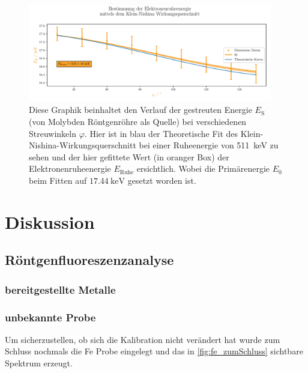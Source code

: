 \documentclass[12pt,english,ngerman]{scrartcl}
\begin{document}
\begin{figure}[H]
	\centering
	\includegraphics[width=0.95\textwidth]{figures/Klein-Nishina.pdf}
	\caption{Diese Graphik beinhaltet den Verlauf der gestreuten
		Energie $E_\text{S}$ (von Molybden Röntgenröhre als Quelle)
		bei verschiedenen Streuwinkeln $\varphi$.
		Hier ist in blau der Theoretische Fit des Klein-Nishina-Wirkungsquerschnitt
		bei einer Ruheenergie von \SI{511}{\kilo\eV} zu sehen und
		der hier gefittete Wert (in oranger Box) der
		Elektronenruheenergie $E_\text{Ruhe}$ ersichtlich. Wobei
		die Primärenergie $E_0$ beim Fitten auf $\SI{17.44}{\kilo\electronvolt}$
		gesetzt worden ist.
	}\label{fig:Klein-Nishina}
\end{figure}

\section{Diskussion}\label{sec:diskussion}

\subsection{Röntgenfluoreszenzanalyse}

\subsubsection{bereitgestellte Metalle}

\subsubsection{unbekannte Probe}

Um sicherzustellen, ob sich die Kalibration nicht verändert hat wurde zum
Schluss nochmals die Fe Probe eingelegt und das in \autoref{fig:fe_zumSchluss}
sichtbare Spektrum erzeugt.
\end{document}
